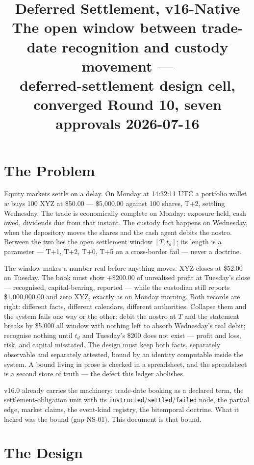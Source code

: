 \documentclass[11pt]{article}
\title{\vspace{-3.5em}Deferred Settlement, v16-Native\\[1pt]
\large The open window between trade-date recognition and custody movement ---\\
\large deferred-settlement design cell, converged Round 10, seven approvals \quad
{\normalsize 2026-07-16}}
\author{}
\date{}
\begin{document}
\maketitle
\vspace{-4.5em}

\section{The Problem}

Equity markets settle on a delay. On Monday at 14:32:11 UTC a portfolio wallet $w$
buys 100 XYZ at \$50.00 --- \$5{,}000.00 against 100 shares, T+2, settling
Wednesday. The trade is economically complete on Monday: exposure held, cash owed,
dividends due from that instant. The custody fact happens on Wednesday, when the
depository moves the shares and the cash agent debits the nostro. Between the two
lies the open settlement window $[T, t_d]$; its length is a parameter --- T+1, T+2,
T+0, T+5 on a cross-border fail --- never a doctrine.

The window makes a number real before anything moves. XYZ closes at \$52.00 on
Tuesday. The book must show $+\$200.00$ of unrealised profit at Tuesday's close ---
recognised, capital-bearing, reported --- while the custodian still reports
\$1{,}000{,}000.00 and zero XYZ, exactly as on Monday morning. Both records are
right: different facts, different calendars, different authorities. Collapse them
and the system fails one way or the other: debit the nostro at $T$ and the
statement breaks by \$5{,}000 all window with nothing left to absorb Wednesday's
real debit; recognise nothing until $t_d$ and Tuesday's \$200 does not exist ---
profit and loss, risk, and capital misstated. The design must keep both facts,
separately observable and separately attested, bound by an identity computable
inside the system. A bound living in prose is checked in a spreadsheet, and the
spreadsheet is a second store of truth --- the defect this ledger abolishes.

v16.0 already carries the machinery: trade-date booking as a declared term, the
settlement-obligation unit with its \texttt{instructed}/\texttt{settled}/\texttt{failed}
node, the partial edge, market claims, the event-kind registry, the bitemporal
doctrine. What it lacked was the bound (gap NS-01). This document is that bound.

\section{The Design}
\end{document}
